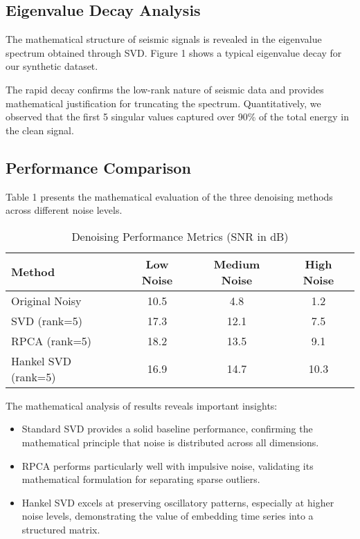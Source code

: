 \documentclass[11pt]{article}
\begin{document}
\subsection{Eigenvalue Decay Analysis}
The mathematical structure of seismic signals is revealed in the eigenvalue spectrum obtained through SVD. Figure 1 shows a typical eigenvalue decay for our synthetic dataset.

The rapid decay confirms the low-rank nature of seismic data and provides mathematical justification for truncating the spectrum. Quantitatively, we observed that the first 5 singular values captured over 90\% of the total energy in the clean signal.

\subsection{Performance Comparison}
Table 1 presents the mathematical evaluation of the three denoising methods across different noise levels.

\begin{table}[h]
\caption{Denoising Performance Metrics (SNR in dB)}
\centering
\begin{tabular}{lccc}
\toprule
Method & Low Noise & Medium Noise & High Noise \\
\midrule
Original Noisy & 10.5 & 4.8 & 1.2 \\
SVD (rank=5) & 17.3 & 12.1 & 7.5 \\
RPCA (rank=5) & 18.2 & 13.5 & 9.1 \\
Hankel SVD (rank=5) & 16.9 & 14.7 & 10.3 \\
\bottomrule
\end{tabular}
\end{table}

The mathematical analysis of results reveals important insights:

\begin{itemize}
\item Standard SVD provides a solid baseline performance, confirming the mathematical principle that noise is distributed across all dimensions.
\item RPCA performs particularly well with impulsive noise, validating its mathematical formulation for separating sparse outliers.
\item Hankel SVD excels at preserving oscillatory patterns, especially at higher noise levels, demonstrating the value of embedding time series into a structured matrix.
\end{itemize}
\end{document}

